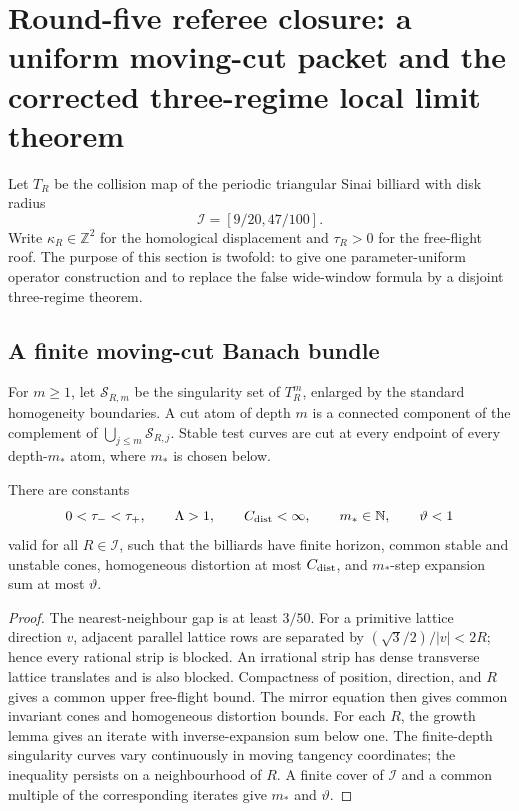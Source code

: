 \section{Round-five referee closure: a uniform moving-cut packet and the corrected three-regime local limit theorem}
\label{sec:r5-a2}

Let \(T_R\) be the collision map of the periodic triangular Sinai billiard
with disk radius
\[
 {\mathcal I}=[9/20,47/100].
\]
Write \(\kappa_R\in\mathbb Z^2\) for the homological displacement and
\(\tau_R>0\) for the free-flight roof.  The purpose of this section is twofold:
to give one parameter-uniform operator construction and to replace the false
wide-window formula by a disjoint three-regime theorem.

\subsection{A finite moving-cut Banach bundle}

For \(m\ge1\), let \({\mathcal S}_{R,m}\) be the singularity set of
\(T_R^m\), enlarged by the standard homogeneity boundaries.  A cut atom of
depth \(m\) is a connected component of the complement of
\(\bigcup_{j\le m}{\mathcal S}_{R,j}\).  Stable test curves are cut at every
endpoint of every depth-\(m_*\) atom, where \(m_*\) is chosen below.

\begin{lemma}
\label{lem:r5-a2-geometry}
There are constants
\[
 0<\tau_-<\tau_+,\qquad
 \Lambda>1,\qquad C_{\rm dist}<\infty,\qquad
 m_*\in\mathbb N,\qquad \vartheta<1
\]
valid for all \(R\in{\mathcal I}\), such that the billiards have finite
horizon, common stable and unstable cones, homogeneous distortion at most
\(C_{\rm dist}\), and \(m_*\)-step expansion sum at most \(\vartheta\).
\end{lemma}

\begin{proof}
The nearest-neighbour gap is at least \(3/50\).  For a primitive lattice
direction \(v\), adjacent parallel lattice rows are separated by
\((\sqrt3/2)/|v|<2R\); hence every rational strip is blocked.  An irrational
strip has dense transverse lattice translates and is also blocked.  Compactness
of position, direction, and \(R\) gives a common upper free-flight bound.
The mirror equation then gives common invariant cones and homogeneous
distortion bounds.  For each \(R\), the growth lemma gives an iterate with
inverse-expansion sum below one.  The finite-depth singularity curves vary
continuously in moving tangency coordinates; the inequality persists on a
neighbourhood of \(R\).  A finite cover of \({\mathcal I}\) and a common
multiple of the corresponding iterates give \(m_*\) and \(\vartheta\).
\end{proof}

